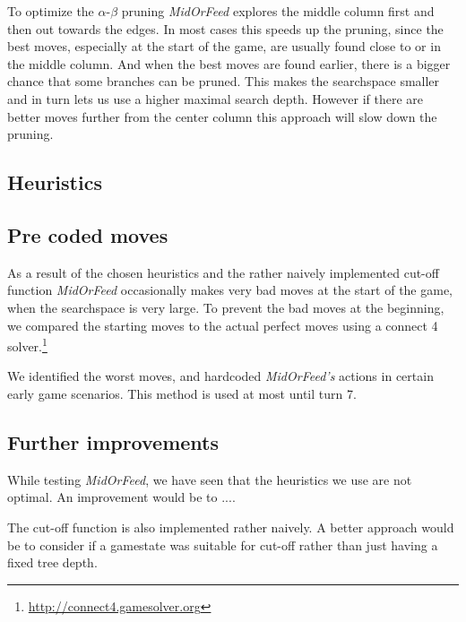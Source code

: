 To optimize the $\alpha$-$\beta$ pruning \textit{MidOrFeed} explores the middle column first and then out towards the edges. In most cases this speeds up the pruning, since the best moves, especially at the start of the game, are usually found close to or in the middle column. And when the best moves are found earlier, there is a bigger chance that some branches can be pruned. This makes the searchspace smaller and in turn lets us use a higher maximal search depth. However if there are better moves further from the center column this approach will slow down the pruning.

\subsection{Heuristics}



\subsection{Pre coded moves}
As a result of the chosen heuristics and the rather naively implemented cut-off function \textit{MidOrFeed} occasionally makes very bad moves at the start of the game, when the searchspace is very large. To prevent the bad moves at the beginning, we compared the starting moves to the actual perfect moves using a connect 4 solver.\footnote{\url{http://connect4.gamesolver.org}}

We identified the worst moves, and hardcoded \textit{MidOrFeed's} actions in certain early game scenarios. This method is used at most until turn 7.

\subsection{Further improvements}
While testing \textit{MidOrFeed}, we have seen that the heuristics we use are not optimal. An improvement would be to ....

The cut-off function is also implemented rather naively. A better approach would be to consider if a gamestate was suitable for cut-off rather than just having a fixed tree depth.
